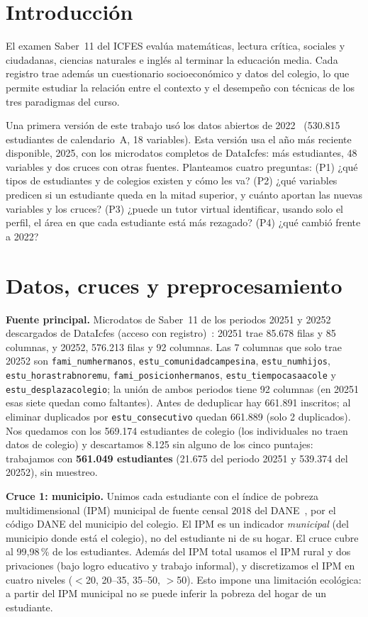 \documentclass[conference]{IEEEtran}
\begin{document}
\section{Introducción}
El examen Saber~11 del ICFES evalúa matemáticas, lectura crítica, sociales y ciudadanas, ciencias naturales e inglés al terminar la educación media. Cada registro trae además un cuestionario socioeconómico y datos del colegio, lo que permite estudiar la relación entre el contexto y el desempeño con técnicas de los tres paradigmas del curso.

Una primera versión de este trabajo usó los datos abiertos de 2022~\cite{icfes22} (530.815 estudiantes de calendario~A, 18 variables). Esta versión usa el año más reciente disponible, 2025, con los microdatos completos de DataIcfes: más estudiantes, 48 variables y dos cruces con otras fuentes. Planteamos cuatro preguntas: (P1) ¿qué tipos de estudiantes y de colegios existen y cómo les va? (P2) ¿qué variables predicen si un estudiante queda en la mitad superior, y cuánto aportan las nuevas variables y los cruces? (P3) ¿puede un tutor virtual identificar, usando solo el perfil, el área en que cada estudiante está más rezagado? (P4) ¿qué cambió frente a 2022?

\section{Datos, cruces y preprocesamiento}
\textbf{Fuente principal.} Microdatos de Saber~11 de los periodos 20251 y 20252 descargados de DataIcfes (acceso con registro)~\cite{dataicfes}: 20251 trae 85.678 filas y 85 columnas, y 20252, 576.213 filas y 92 columnas. Las 7 columnas que solo trae 20252 son \texttt{fami\_numhermanos}, \texttt{estu\_comunidadcampesina}, \texttt{estu\_numhijos}, \texttt{estu\_horastrabnoremu}, \texttt{fami\_posicionhermanos}, \texttt{estu\_tiempocasaacole} y \texttt{estu\_desplazacolegio}; la unión de ambos periodos tiene 92 columnas (en 20251 esas siete quedan como faltantes). Antes de deduplicar hay 661.891 inscritos; al eliminar duplicados por \texttt{estu\_consecutivo} quedan 661.889 (solo 2 duplicados). Nos quedamos con los 569.174 estudiantes de colegio (los individuales no traen datos de colegio) y descartamos 8.125 sin alguno de los cinco puntajes: trabajamos con \textbf{561.049 estudiantes} (21.675 del periodo 20251 y 539.374 del 20252), sin muestreo.

\textbf{Cruce 1: municipio.} Unimos cada estudiante con el índice de pobreza multidimensional (IPM) municipal de fuente censal 2018 del DANE~\cite{dane}, por el código DANE del municipio del colegio. El IPM es un indicador \emph{municipal} (del municipio donde está el colegio), no del estudiante ni de su hogar. El cruce cubre al 99,98\,\% de los estudiantes. Además del IPM total usamos el IPM rural y dos privaciones (bajo logro educativo y trabajo informal), y discretizamos el IPM en cuatro niveles ($<$20, 20--35, 35--50, $>$50). Esto impone una limitación ecológica: a partir del IPM municipal no se puede inferir la pobreza del hogar de un estudiante.
\end{document}
